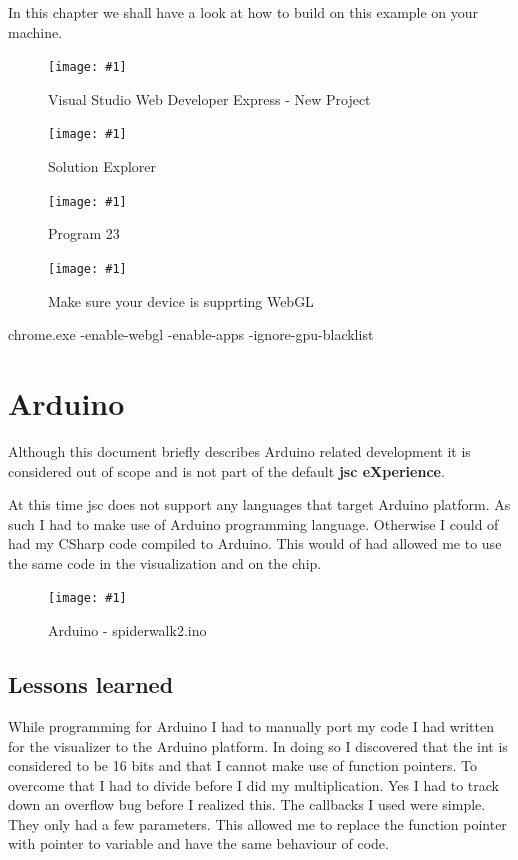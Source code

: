 \documentclass[12pt,leqno]{book}
\newcommand{\png}[1]{\texttt{[image: \#1]}}
\newcommand{\figpng}[2]{\begin{figure}[H!tb]\centering\png{#1}\caption{#2}\end{figure}}
\begin{document}
In this chapter we shall have a look at how to build on this example on your machine.



\figpng{Images/New_Project-2012-03-13_09.19.10}
{Visual Studio Web Developer Express - New Project}

\figpng{Images/SpiderModel_-_Microsoft_Visual_Studio-2012-03-14_15.39.19}
{Solution Explorer}

\figpng{Images/A_string_from_JavaScript._-_Google_Chrome-2012-03-14_16.12.04}
{Program 23}

\figpng{Images/aboutgpu_-_Google_Chrome-2012-03-14_17.56.30}
{Make sure your device is supprting WebGL}

\begin{framed}
chrome.exe -enable-webgl -enable-apps -ignore-gpu-blacklist
\end{framed}





\section{Arduino}
Although this document briefly describes Arduino related development it is considered out of scope and is not part of the default \textbf{jsc eXperience}.

At this time jsc does not support any languages that target Arduino platform. As such I had to make use of Arduino programming language. Otherwise I could of had my CSharp code compiled to Arduino. This would of had allowed me to use the same code in the visualization and on the chip.

\figpng{Images/spiderwalk2__Arduino_1.0-2012-03-14_18.04.43}
{Arduino - spiderwalk2.ino}


\subsection{Lessons learned}
While programming for Arduino I had to manually port my code I had written for the visualizer to the Arduino platform. In doing so I discovered that the int is considered to be 16 bits and that I cannot make use of function pointers. To overcome that I had to divide before I did my multiplication. Yes I had to track down an overflow bug before I realized this. The callbacks I used were simple. They only had a few parameters. This allowed me to replace the function pointer with pointer to variable and have the same behaviour of code.
\end{document}

